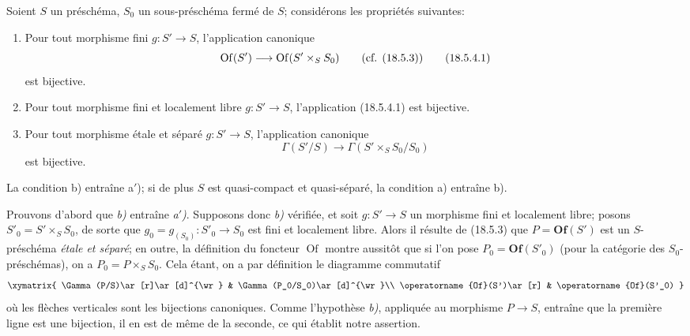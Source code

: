 \begin{proposition}[18.5.4]
\label{IV.18.5.4}
Soient $S$ un préschéma, $S_0$ un sous-préschéma fermé de $S$; considérons les propriétés suivantes:
\begin{enumerate}
  \item[\textup{a)}] Pour tout morphisme \textup{fini} $g:S'\to S$, l'application canonique
  \begin{equation}
    \operatorname{Of}(S')\longrightarrow\operatorname{Of}(S'\times_S S_0)\qquad\textup{(cf. (18.5.3))}
    \tag{18.5.4.1}\label{IV.18.5.4.1}
  \end{equation}
  est bijective.
  \item[\textup{a$'$)}] Pour tout morphisme \textup{fini et localement libre} $g:S'\to S$, l'application \textup{(18.5.4.1)} est bijective.


  \item[\textup{b)}] Pour tout morphisme \textup{étale et séparé} $g:S'\to S$, l'application canonique
  \begin{equation}
    \Gamma(S'/S)\longrightarrow\Gamma(S'\times_S S_0/S_0)
    \tag{18.5.4.2}\label{IV.18.5.4.2}
  \end{equation}
  est bijective.
\end{enumerate}

La condition \textup{b)} entraîne \textup{a$'$)}; si de plus $S$ est quasi-compact et quasi-séparé, la condition \textup{a)} entraîne \textup{b)}.
\end{proposition}

Prouvons d'abord que \emph{b)} entraîne \emph{a$'$)}. Supposons donc \emph{b)} vérifiée, et soit $g:S'\to S$ un morphisme fini et localement libre; posons $S'_0=S'\times_S S_0$, de sorte que $g_0=g_{(S_0)}:S'_0\to S_0$ est fini et localement libre. Alors il résulte de (18.5.3) que $P=\mathbf{Of}(S')$ est un $S$-préschéma \emph{étale et séparé}; en outre, la définition du foncteur $\operatorname{Of}$ montre aussitôt que si l'on pose $P_0=\mathbf{Of}(S'_0)$ (pour la catégorie des $S_0$-préschémas), on a $P_0=P\times_S S_0$. Cela étant, on a par définition le diagramme commutatif
\[
\xymatrix{
  \Gamma(P/S)\ar[r]\ar[d]^{\wr} & \Gamma(P_0/S_0)\ar[d]^{\wr}\\
  \operatorname{Of}(S')\ar[r] & \operatorname{Of}(S'_0)
}
\]
où les flèches verticales sont les bijections canoniques. Comme l'hypothèse \emph{b)}, appliquée au morphisme $P\to S$, entraîne que la première ligne est une bijection, il en est de même de la seconde, ce qui établit notre assertion.

